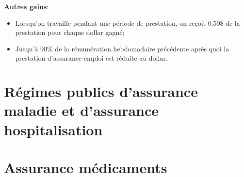 \documentclass[10pt, french]{article}
\begin{document}
\begin{multicols*}{3}
\begin{definitionNOHFILLsub}[Fiscalité]
\textbf{Autres gains}:
\begin{itemize}[leftmargin = *]
	\item	Lorsqu'on travaille pendant une période de prestation, on reçoit 0.50\$ de la prestation pour chaque dollar gagné;
	\item	Jusqu'à 90\% de la rémunération hebdomadaire précédente après quoi la prestation d'assurance-emploi est réduite au dollar.
\end{itemize}
\end{definitionNOHFILLsub}

\newpage

\section{Régimes publics d'assurance maladie et d'assurance hospitalisation}

\newpage

\section{Assurance médicaments}


\end{multicols*}
\end{document}
